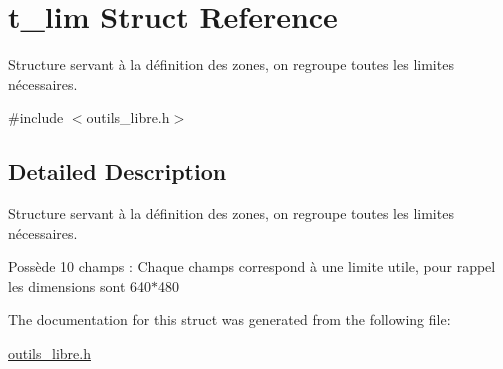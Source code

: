 \hypertarget{structt__lim}{\section{t\-\_\-lim Struct Reference}
\label{structt__lim}
}


Structure servant à la définition des zones, on regroupe toutes les limites nécessaires.  




{\ttfamily \#include $<$outils\-\_\-libre.\-h$>$}



\subsection{Detailed Description}
Structure servant à la définition des zones, on regroupe toutes les limites nécessaires. 

Possède 10 champs \-: Chaque champs correspond à une limite utile, pour rappel les dimensions sont 640$\ast$480 

The documentation for this struct was generated from the following file\-:\begin{DoxyCompactItemize}
\item 
\hyperlink{outils__libre_8h}{outils\-\_\-libre.\-h}\end{DoxyCompactItemize}

